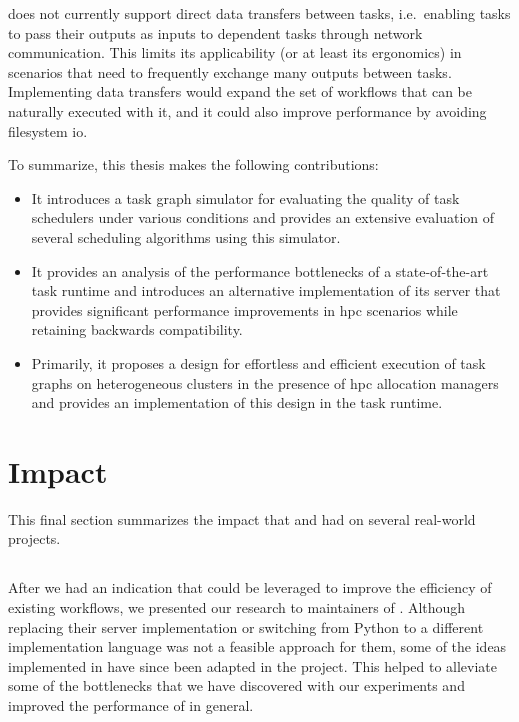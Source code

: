 \begin{description}[wide=0pt]
		\hyperqueue{} does not currently support direct data transfers
		between tasks, i.e.\ enabling tasks to pass their outputs as inputs to dependent tasks through
		network communication. This limits its applicability (or at least its ergonomics) in scenarios that
		need to frequently exchange many outputs between tasks. Implementing data transfers would expand
		the set of workflows that can be naturally executed with it, and it could also improve performance
		by avoiding filesystem \gls{io}.
\end{description}

To summarize, this thesis makes the following contributions:
\begin{itemize}
	\item It introduces a task graph simulator for evaluating the quality of task schedulers under various
	      conditions and provides an extensive evaluation of several scheduling algorithms using this
	      simulator.
	\item It provides an analysis of the performance bottlenecks of a state-of-the-art task runtime
	      \dask{} and introduces an alternative implementation of its server that provides
	      significant performance improvements in \gls{hpc} scenarios while retaining
	      backwards compatibility.
	\item Primarily, it proposes a design for effortless and efficient execution of task graphs on
	      heterogeneous clusters in the presence of \gls{hpc} allocation managers and
	      provides an implementation of this design in the \hyperqueue{} task runtime.
\end{itemize}

\section{Impact}
This final section summarizes the impact that \rsds{} and
\hyperqueue{} had on several real-world projects.

\vspace{-2mm}\subsection*{\rsds{}}
After we had an indication that \rsds{} could be leveraged to improve the
efficiency of existing \dask{} workflows, we presented our \rsds{} research to maintainers of \dask{}. Although replacing their server implementation or switching from Python
to a different implementation language was not a feasible approach for them, some of the ideas
implemented in \rsds{} have since been adapted in the \dask{}
project. This helped to alleviate some of the bottlenecks that we have discovered with our
experiments and improved the performance of \dask{} in
general.

